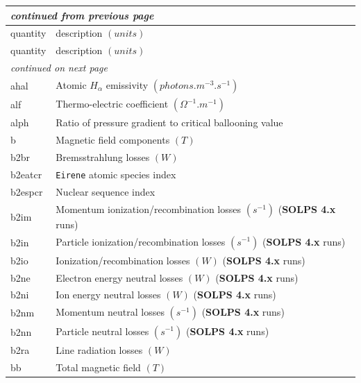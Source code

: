 \documentclass[a4paper,10pt]{report}
\newcommand\SOLPSfour{{\bf SOLPS 4.x} }
\begin{document}
\begin{center}
  \begin{longtable}{|l|l|}
    \hline
    \multicolumn{2}{|l|}{\small\sl continued from previous page} \\
    \hline quantity & description $(units)$ \\
    \hline \endhead
    \hline quantity & description $(units)$ \\
    \hline \endfirsthead
    \hline
    \multicolumn{2}{|l|}{\small\sl continued on next page} \\
    \hline \endfoot
    \endlastfoot
    ahal     & \index{b2plot, ahal} Atomic $H_\alpha$ emissivity $(photons.m^{-3}.s^{-1})$ \\
    alf      & \index{b2plot, alf} Thermo-electric coefficient $(\Omega^{-1}.m^{-1})$ \\
    alph     & \index{b2plot, alph} Ratio of pressure gradient to critical ballooning value \\
    b        & \index{b2plot, b} Magnetic field components $(T)$ \\
    b2br     & \index{b2plot, b2br} Bremsstrahlung losses $(W)$ \\
    b2eatcr  & \index{b2plot, b2eatcr} {\tt Eirene} atomic species index \\
    b2espcr  & \index{b2plot, b2espcr} Nuclear sequence index \\
    b2im     & \index{b2plot, b2im} Momentum ionization/recombination losses $(s^{-1})$ (\SOLPSfour runs) \\
    b2in     & \index{b2plot, b2in} Particle ionization/recombination losses $(s^{-1})$ (\SOLPSfour runs) \\
    b2io     & \index{b2plot, b2io} Ionization/recombination losses $(W)$ (\SOLPSfour runs) \\
    b2ne     & \index{b2plot, b2ne} Electron energy neutral losses $(W)$ (\SOLPSfour runs) \\
    b2ni     & \index{b2plot, b2ni} Ion energy neutral losses $(W)$ (\SOLPSfour runs) \\
    b2nm     & \index{b2plot, b2nm} Momentum neutral losses $(s^{-1})$ (\SOLPSfour runs) \\
    b2nn     & \index{b2plot, b2nn} Particle neutral losses $(s^{-1})$  (\SOLPSfour runs)\\
    b2ra     & \index{b2plot, b2ra} Line radiation losses $(W)$ \\
    bb       & \index{b2plot, bb} Total magnetic field $(T)$ \\

\end{longtable}
\end{center}
\end{document}
